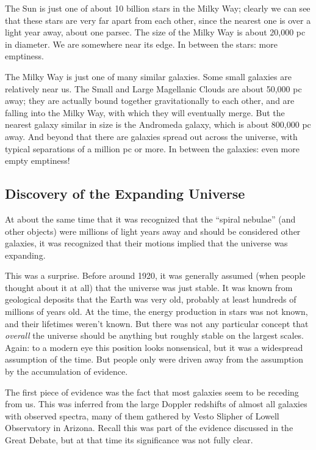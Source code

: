\documentclass[12pt, preprint]{aastex}
\begin{document}
The Sun is just one of about 10 billion stars in the Milky Way;
clearly we can see that these stars are very far apart from each
other, since the nearest one is over a light year away, about one
parsec.  The size of the Milky Way is about 20,000 pc in diameter.  We
are somewhere near its edge.  In between the stars: more emptiness.

The Milky Way is just one of many similar galaxies. Some small
galaxies are relatively near us. The Small and Large Magellanic Clouds
are about 50,000 pc away; they are actually bound together
gravitationally to each other, and are falling into the Milky Way,
with which they will eventually merge. But the nearest galaxy similar
in size is the Andromeda galaxy, which is about 800,000 pc away. And
beyond that there are galaxies spread out across the universe, with
typical separations of a million pc or more.  In between the galaxies:
even more empty emptiness!

\subsection{Discovery of the Expanding Universe}

At about the same time that it was recognized that the ``spiral
nebulae'' (and other objects) were millions of light years away and
should be considered other galaxies, it was recognized that their
motions implied that the universe was expanding.

This was a surprise. Before around 1920, it was generally assumed
(when people thought about it at all) that the universe was just
stable. It was known from geological deposits that the Earth was very
old, probably at least hundreds of millions of years old. At the time,
the energy production in stars was not known, and their lifetimes
weren't known. But there was not any particular concept that {\it
  overall} the universe should be anything but roughly stable on the
largest scales. Again: to a modern eye this position looks
nonsensical, but it was a widespread assumption of the time. But
people only were driven away from the assumption by the accumulation
of evidence.

The first piece of evidence was the fact that most galaxies seem to be
receding from us. This was inferred from the large Doppler redshifts
of almost all galaxies with observed spectra, many of them gathered by
Vesto Slipher of Lowell Observatory in Arizona. Recall this was part
of the evidence discussed in the Great Debate, but at that time its
significance was not fully clear.
\end{document}
